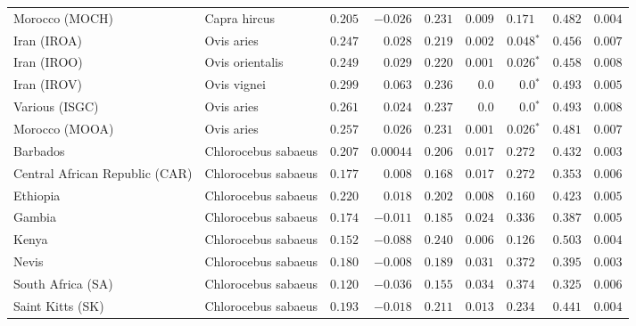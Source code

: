 \begin{center}
\begin{adjustbox}{width = 1\textwidth}
\begin{tabular}{|l|l|r|r|r|r|r|r|r|}
            Morocco (MOCH)                    & Capra hircus     & $ 0.205$ & $-0.026$  & $ 0.231$ & $ 0.009$ & $ 0.171~~$ & $ 0.482$ & $ 0.004$ \\
            Iran (IROA)                    & Ovis aries         & $ 0.247$ & $ 0.028$  & $ 0.219$ & $ 0.002$    & $\bm{ 0.048{^*}}$    & $ 0.456$ & $ 0.007$ \\
            Iran (IROO)                 & Ovis orientalis          & $ 0.249$ & $ 0.029$  & $ 0.220$ & $ 0.001$    & $\bm{ 0.026{^*}}$    & $ 0.458$ & $ 0.008$ \\
            Iran (IROV)                 & Ovis vignei          & $ 0.299$ & $ 0.063$  & $ 0.236$ & $0.0$ & $\bm{0.0{^*}}$ & $ 0.493$ & $ 0.005$ \\
            Various (ISGC)                       & Ovis aries & $ 0.261$ & $ 0.024$ & $ 0.237$ & $0.0$ & $\bm{0.0{^*}}$        & $ 0.493$ & $ 0.008$ \\
            Morocco (MOOA) & Ovis aries & $ 0.257$ & $ 0.026$  & $ 0.231$ & $ 0.001$ & $\bm{ 0.026{^*}}$ & $ 0.481$ & $ 0.007$ \\
            Barbados                       & Chlorocebus sabaeus & $ 0.207$ & $0.00044$  & $ 0.206$ & $ 0.017$ & $ 0.272~~$        & $ 0.432$ & $ 0.003$ \\
            Central African Republic (CAR)                         & Chlorocebus sabaeus & $ 0.177$ & $ 0.008$  & $ 0.168$ & $ 0.017$ & $ 0.272~~$        & $ 0.353$ & $ 0.006$ \\
            Ethiopia                          & Chlorocebus sabaeus & $ 0.220$ & $ 0.018$  & $ 0.202$ & $ 0.008$ & $ 0.160~~$        & $ 0.423$ & $ 0.005$ \\
            Gambia                          & Chlorocebus sabaeus & $ 0.174$ & $-0.011$  & $ 0.185$ & $ 0.024$ & $ 0.336~~$        & $ 0.387$ & $ 0.005$ \\
            Kenya              & Chlorocebus sabaeus & $ 0.152$ & $-0.088$  & $ 0.240$ & $ 0.006$ & $ 0.126~~$ & $ 0.503$ & $ 0.004$ \\
            Nevis               & Chlorocebus sabaeus & $ 0.180$ & $-0.008$  & $ 0.189$ & $ 0.031$ & $ 0.372~~$ & $ 0.395$ & $ 0.003$ \\
            South Africa (SA)                         & Chlorocebus sabaeus & $ 0.120$ & $-0.036$  & $ 0.155$ & $ 0.034$ & $ 0.374~~$        & $ 0.325$ & $ 0.006$ \\
            Saint Kitts (SK)                  & Chlorocebus sabaeus        & $ 0.193$ & $-0.018$  & $ 0.211$ & $ 0.013$ & $ 0.234~~$        & $ 0.441$ & $ 0.004$ \\

\end{tabular}
\end{adjustbox}
\end{center}
